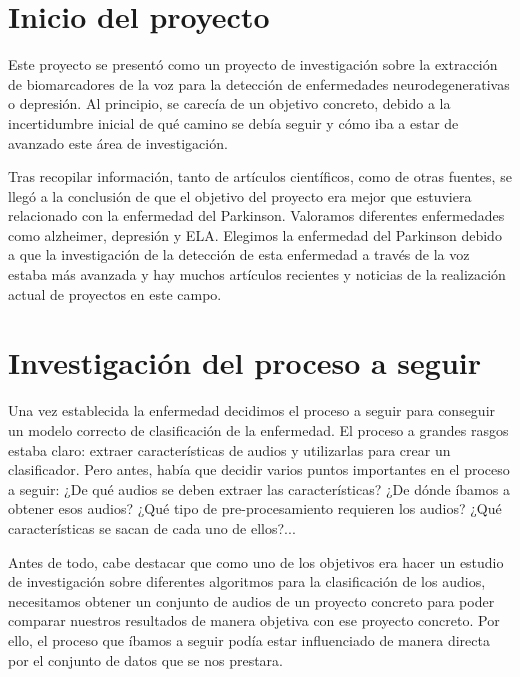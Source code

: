 
\section{Inicio del proyecto}
Este proyecto se presentó como un proyecto de investigación sobre la extracción de biomarcadores de la voz para la detección de enfermedades neurodegenerativas o depresión. Al principio, se carecía de un objetivo concreto, debido a la incertidumbre inicial de qué camino se debía seguir y cómo iba a estar de avanzado este área de investigación.

Tras recopilar información, tanto de artículos científicos, como de otras fuentes, se llegó a la conclusión de que el objetivo del proyecto era mejor que estuviera relacionado con la enfermedad del Parkinson. Valoramos diferentes enfermedades como alzheimer, depresión y ELA. Elegimos la enfermedad del Parkinson debido a que la investigación de la detección de esta enfermedad a través de la voz estaba más avanzada y hay muchos artículos recientes y noticias de la realización actual de proyectos en este campo. 

\section{Investigación del proceso a seguir}
Una vez establecida la enfermedad decidimos el proceso a seguir para conseguir un modelo correcto de clasificación de la enfermedad. El proceso a grandes rasgos estaba claro: extraer características de audios y utilizarlas para crear un clasificador. Pero antes, había que decidir varios puntos importantes en el proceso a seguir: ¿De qué audios se deben extraer las características? ¿De dónde íbamos a obtener esos audios? ¿Qué tipo de pre-procesamiento requieren los audios? ¿Qué características se sacan de cada uno de ellos?...

Antes de todo, cabe destacar que como uno de los objetivos era hacer un estudio de investigación sobre diferentes algoritmos para la clasificación de los audios, necesitamos obtener un conjunto de audios de un proyecto concreto para poder comparar nuestros resultados de manera objetiva con ese proyecto concreto. Por ello, el proceso que íbamos a seguir podía estar influenciado de manera directa por el conjunto de datos que se nos prestara.


